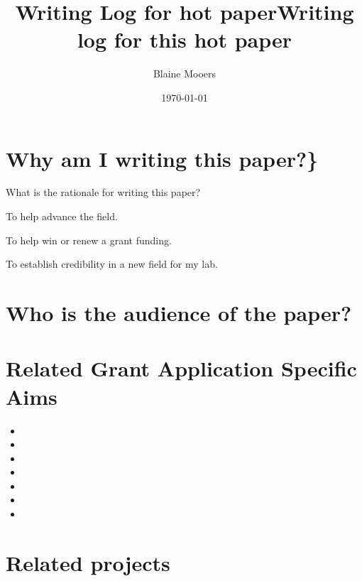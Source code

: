 \documentclass[11pt,letterpaper]{article}
\title{Writing Log for hot paper}
\author{Blaine Mooers}
\date{\today}
\title{Writing log for this hot paper}
\begin{document}
\maketitle
\maketitle


\tableofcontents



\section{Why am I writing this paper?\}}
\label{sec:org930caa3}

What is the rationale for writing this paper?

To help advance the field.

To help win or renew a grant funding.

To establish credibility in a new field for my lab.


\section{Who is the audience of the paper?}
\label{sec:org5dda5c4}



\section{Related Grant Application Specific Aims}
\label{sec:org69fb510}

\begin{itemize}
\item 

\item 

\item 

\item 

\item 

\item 

\item 
\end{itemize}


\section{Related projects}
\label{sec:orge574036}
\end{document}
